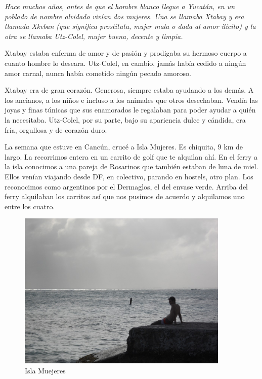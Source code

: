 \documentclass[12pt,twoside,openright,a5paper]{book}
\begin{document}
{\em Hace muchos años, antes de que el hombre blanco llegue a Yucatán,
en un poblado de nombre olvidado vivían dos mujeres. Una se llamaba Xtabay
y era llamada Xkeban (que significa prostituta, mujer mala o dada al amor
ilícito) y la otra se llamaba Utz-Colel, mujer buena, decente y limpia.

Xtabay estaba enferma de amor y de pasión y prodigaba su hermoso cuerpo
a cuanto hombre lo deseara. Utz-Colel, en cambio, jamás había cedido a
ningún amor carnal, nunca había cometido ningún pecado amoroso.

Xtabay era de gran corazón. Generosa, siempre estaba ayudando a los
demás. A los ancianos, a los niños e incluso a los animales que otros
desechaban. Vendía las joyas y finas túnicas que sus enamorados le regalaban
para poder ayudar a quién la necesitaba. Utz-Colel, por su parte, bajo su
apariencia dulce y cándida, era fría, orgullosa y de corazón duro.}


\vspace{0.5cm}
\hrulefill\hspace{0.2cm} \decofourleft\decofourright \hspace{0.2cm} \hrulefill
\vspace{0.5cm}

La semana que estuve en Cancún, crucé a Isla Mujeres. Es chiquita, 9 km de
largo. La recorrimos entera en un carrito de golf que te alquilan ahí. En
el ferry a la isla conocimos a una pareja de Rosarinos que también estaban
de luna de miel. Ellos venían viajando desde DF, en colectivo, parando
en hostels, otro plan. Los reconocimos como argentinos por el Dermaglos,
el del envase verde. Arriba del ferry alquilaban los carritos así que nos
pusimos de acuerdo y alquilamos uno entre los cuatro.

\begin{figure}[H]
  \centering
    \includegraphics[width=0.9\textwidth]{fotos/2012/islaMujeres}
  \caption{Isla Muejeres} \label{Isla Mujeres}
\end{figure}
\end{document}
